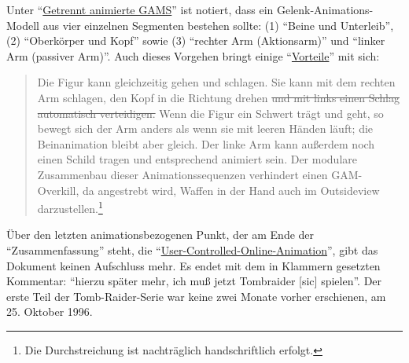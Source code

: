 \documentclass[a5paper,pagesize]{scrbook}
\begin{document}
Unter \enquote{\uline{Getrennt animierte GAMS}} ist notiert, dass ein Gelenk-Animations-Modell aus vier einzelnen Segmenten bestehen sollte: (1) \enquote{Beine und Unterleib}, (2) \enquote{Oberkörper und Kopf} sowie (3) \enquote{rechter Arm (Aktionsarm)} und \enquote{linker Arm (passiver Arm)}.
Auch dieses Vorgehen bringt einige \enquote{\uline{Vorteile}} mit sich:

\begin{quote}
   Die Figur kann gleichzeitig gehen und schlagen.
   Sie kann mit dem rechten Arm schlagen, den Kopf in die Richtung drehen \sout{und mit links einen Schlag automatisch verteidigen.}
   Wenn die Figur ein Schwert trägt und geht, so bewegt sich der Arm anders als wenn sie mit leeren Händen läuft; die Beinanimation bleibt aber gleich.
   Der linke Arm kann außerdem noch einen Schild tragen und entsprechend animiert sein.
   Der modulare Zusammenbau dieser Animationssequenzen verhindert einen GAM-Overkill, da angestrebt wird, Waffen in der Hand auch im Outsideview darzustellen.\footnote{Die Durchstreichung ist nachträglich handschriftlich erfolgt.}
\end{quote}

Über den letzten animationsbezogenen Punkt, der am Ende der \enquote{Zusammenfassung} steht, die \enquote{\uline{User-Controlled-Online-Animation}}, gibt das Dokument keinen Aufschluss mehr. %
Es endet mit dem in Klammern gesetzten Kommentar: \enquote{hierzu später mehr, ich muß jetzt Tombraider [sic] spielen}.
Der erste Teil der Tomb-Raider-Serie war keine zwei Monate vorher erschienen, am 25. Oktober 1996.
\end{document}

